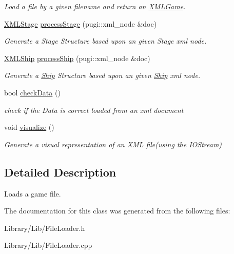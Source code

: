 \begin{DoxyCompactItemize}
\begin{DoxyCompactList}\small\item\em Load a file by a given filename and return an \hyperlink{structty_lib_1_1_x_m_l_game}{X\+M\+L\+Game}. \end{DoxyCompactList}\item 
\hypertarget{classty_lib_1_1_file_loader_a220ed5f763c37a2f4a2da48fe0a66883}{}\hyperlink{structty_lib_1_1_x_m_l_stage}{X\+M\+L\+Stage} \hyperlink{classty_lib_1_1_file_loader_a220ed5f763c37a2f4a2da48fe0a66883}{process\+Stage} (pugi\+::xml\+\_\+node \&doc)\label{classty_lib_1_1_file_loader_a220ed5f763c37a2f4a2da48fe0a66883}

\begin{DoxyCompactList}\small\item\em Generate a Stage Structure based upon an given Stage xml node. \end{DoxyCompactList}\item 
\hypertarget{classty_lib_1_1_file_loader_aa4e1406b5da4b9134f585d169e06354b}{}\hyperlink{structty_lib_1_1_x_m_l_ship}{X\+M\+L\+Ship} \hyperlink{classty_lib_1_1_file_loader_aa4e1406b5da4b9134f585d169e06354b}{process\+Ship} (pugi\+::xml\+\_\+node \&doc)\label{classty_lib_1_1_file_loader_aa4e1406b5da4b9134f585d169e06354b}

\begin{DoxyCompactList}\small\item\em Generate a \hyperlink{classty_lib_1_1_ship}{Ship} Structure based upon an given \hyperlink{classty_lib_1_1_ship}{Ship} xml node. \end{DoxyCompactList}\item 
\hypertarget{classty_lib_1_1_file_loader_aaf6738ee2dbfbea6687cdacaa9e6e5b7}{}bool \hyperlink{classty_lib_1_1_file_loader_aaf6738ee2dbfbea6687cdacaa9e6e5b7}{check\+Data} ()\label{classty_lib_1_1_file_loader_aaf6738ee2dbfbea6687cdacaa9e6e5b7}

\begin{DoxyCompactList}\small\item\em check if the Data is correct loaded from an xml document \end{DoxyCompactList}\item 
\hypertarget{classty_lib_1_1_file_loader_ab1a2e00c9eb13cab8445693bd1b51185}{}void \hyperlink{classty_lib_1_1_file_loader_ab1a2e00c9eb13cab8445693bd1b51185}{visualize} ()\label{classty_lib_1_1_file_loader_ab1a2e00c9eb13cab8445693bd1b51185}

\begin{DoxyCompactList}\small\item\em Generate a visual representation of an X\+M\+L file(using the I\+O\+Stream) \end{DoxyCompactList}\end{DoxyCompactItemize}


\subsection{Detailed Description}
Loads a game file. 

The documentation for this class was generated from the following files\+:\begin{DoxyCompactItemize}
\item 
Library/\+Lib/File\+Loader.\+h\item 
Library/\+Lib/File\+Loader.\+cpp\end{DoxyCompactItemize}
